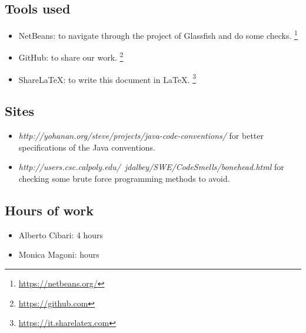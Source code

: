 \subsection*{Tools used}
    \begin{itemize}
        \item NetBeans: to navigate through the project of Glassfish and do some checks. 
            \footnote{\url{https://netbeans.org/}} 
        \item GitHub: to share our work. 
            \footnote{\url{https://github.com}} 
        \item ShareLaTeX: to write this document in LaTeX. 
            \footnote{\url{https://it.sharelatex.com}}
    \end{itemize}

\subsection*{Sites}
    \begin{itemize}
        \item \textit{http://yohanan.org/steve/projects/java-code-conventions/} for better specifications of the Java conventions.
        \item \textit{http://users.csc.calpoly.edu/~jdalbey/SWE/CodeSmells/bonehead.html} for checking some brute force programming methods to avoid.
    \end{itemize}

\subsection*{Hours of work}
    \begin{itemize}
    \item Alberto Cibari: 4 hours
    \item Monica Magoni:  hours
    \end{itemize}
